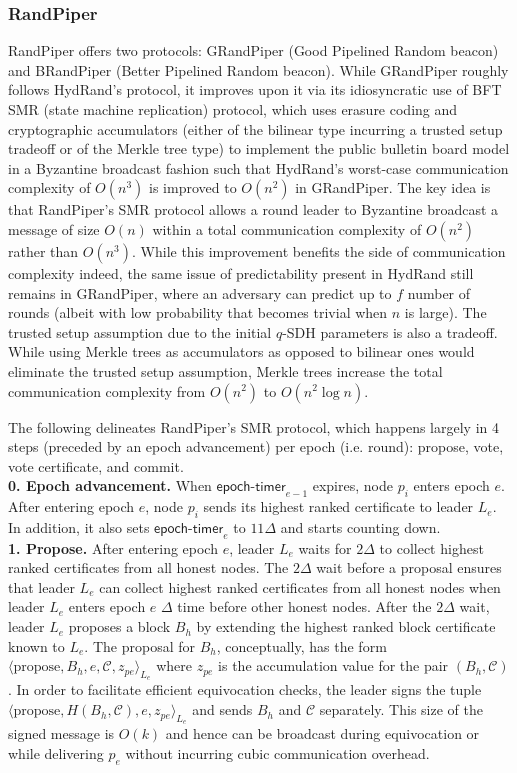 \documentclass[11pt]{article}
\theoremstyle{definition}
\theoremstyle{remark}
\begin{document}
\subsubsection{RandPiper}
RandPiper offers two protocols: GRandPiper (Good Pipelined Random beacon) and BRandPiper (Better Pipelined Random beacon). While GRandPiper roughly follows HydRand's protocol, it improves upon it via its idiosyncratic use of BFT SMR (state machine replication) protocol, which uses erasure coding and cryptographic accumulators (either of the bilinear type incurring a trusted setup tradeoff or of the Merkle tree type) to implement the public bulletin board model in a Byzantine broadcast fashion such that HydRand's worst-case communication complexity of $O(n^3)$ is improved to $O(n^2)$ in GRandPiper. The key idea is that RandPiper's SMR protocol allows a round leader to Byzantine broadcast a message of size $O(n)$ within a total communication complexity of $O(n^2)$ rather than $O(n^3)$. While this improvement benefits the side of communication complexity indeed, the same issue of predictability present in HydRand still remains in GRandPiper, where an adversary can predict up to $f$ number of rounds (albeit with low probability that becomes trivial when $n$ is large). The trusted setup assumption due to the initial $q$-SDH parameters is also a tradeoff. While using Merkle trees as accumulators as opposed to bilinear ones would eliminate the trusted setup assumption, Merkle trees increase the total communication complexity from $O(n^2)$ to $O(n^2 \log n)$.

The following delineates RandPiper's SMR protocol, which happens largely in 4 steps (preceded by an epoch advancement) per epoch (i.e. round): propose, vote, vote certificate, and commit.\\

\textbf{0. Epoch advancement.} When $\mathsf{epoch\mbox{-}timer}_{e - 1}$ expires, node $p_i$ enters epoch $e$. After entering epoch $e$, node $p_i$ sends its highest ranked certificate to leader $L_e$. In addition, it also sets $\mathsf{epoch\mbox{-}timer}_e$ to $11 \Delta$ and starts counting down.\\

\textbf{1. Propose.} After entering epoch $e$, leader $L_e$ waits for $2 \Delta$ to collect highest ranked certificates from all honest nodes. The $2 \Delta$ wait before a proposal ensures that leader $L_e$ can collect highest ranked certificates from all honest nodes when leader $L_e$ enters epoch $e$ $\Delta$ time before other honest nodes. After the $2 \Delta$ wait, leader $L_e$ proposes a block $B_h$ by extending the highest ranked block certificate known to $L_e$. The proposal for $B_h$, conceptually, has the form $\langle \text{propose}, B_h, e, \mathcal{C}, z_{pe} \rangle_{L_e}$ where $z_{pe}$ is the accumulation value for the pair $(B_h, \mathcal{C})$. In order to facilitate efficient equivocation checks, the leader signs the tuple $\langle \text{propose}, H(B_h, \mathcal{C}), e, z_{pe} \rangle_{L_e}$ and sends $B_h$ and $\mathcal{C}$ separately. This size of the signed message is $O(k)$ and hence can be broadcast during equivocation or while delivering $p_e$ without incurring cubic communication overhead.\\
\end{document}
